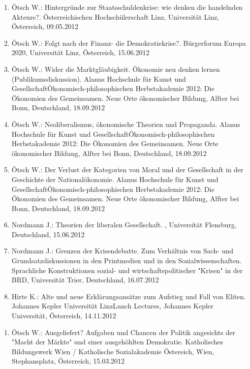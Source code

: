 \begin{enumerate}
	\item Ötsch W.: Hintergründe zur Staatsschuldenkrise: wie denken die handelnden Akteure?. Österreichischen Hochschülerschaft Linz, Universität Linz, Österreich, 09.05.2012
	\item Ötsch W.: Folgt nach der Finanz- die Demokratiekrise?. Bürgerforum Europa 2020, Universität Linz, Österreich, 15.06.2012
	\item Ötsch W.: Wider die Marktgläubigkeit. Ökonomie neu denken lernen (Publikumsdiskussion). Alanus Hochschule für Kunst und GesellschaftÖkonomisch-philosophischen Herbstakademie 2012: Die Ökonomien des Gemeinsamen. Neue Orte ökonomischer Bildung, Alfter bei Bonn, Deutschland, 18.09.2012
	\item Ötsch W.: Neoliberalismus, ökonomische Theorien und Propaganda. Alanus Hochschule für Kunst und GesellschaftÖkonomisch-philosophischen Herbstakademie 2012: Die Ökonomien des Gemeinsamen. Neue Orte ökonomischer Bildung, Alfter bei Bonn, Deutschland, 18.09.2012
	\item Ötsch W.: Der Verlust der Kategorien von Moral und der Gesellschaft in der Geschichte der Nationalökonomie. Alanus Hochschule für Kunst und GesellschaftÖkonomisch-philosophischen Herbstakademie 2012: Die Ökonomien des Gemeinsamen. Neue Orte ökonomischer Bildung, Alfter bei Bonn, Deutschland, 18.09.2012
	\item Nordmann J.: Theorien der liberalen Gesellschaft. , Universität Flensburg, Deutschland, 15.06.2012
	\item Nordmann J.: Grenzen der Krisendebatte. Zum Verhältnis von Sach- und Grundsatzdiskussionen in den Printmedien und in den Sozialwissenschaften. Sprachliche Konstruktionen sozial- und wirtschaftspolitischer "Krisen" in der BRD, Universität Trier, Deutschland, 16.07.2012
	\item Hirte K.: Alte und neue Erklärungsansätze zum Aufstieg und Fall von Eliten. Johannes Kepler Universität LinzLunch Lectures, Johannes Kepler Universität, Österreich, 14.11.2012
\end{enumerate}

\begin{enumerate}
	\item Ötsch W.: Ausgeliefert? Aufgaben und Chancen der Politik angesichts der "Macht der Märkte" und einer ausgehöhlten Demokratie. Katholisches Bildungswerk Wien / Katholische Sozialakademie Östereich, Wien, Stephansplatz, Österreich, 15.03.2012
\end{enumerate}

